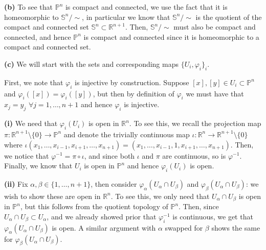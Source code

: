 \documentclass[10pt]{article}
\newcommand{\R}{\mathbb{R}}
\newcommand{\Sp}{\mathbb{S}}
\newcommand{\Pro}{\mathbb{P}}
\begin{document}
\textbf{(b)} To see that $\Pro^{n}$ is compact and connected, we use the fact that it is homeomorphic to $\Sp^{n}/\sim$, in particular we know that $\Sp^{n}/\sim$ is the quotient of the compact and connected set $\Sp^{n}\subset \R^{n+1}$. Then, $\Sp^{n}/\sim$ must also be compact and connected, and hence $\Pro^{n}$ is compact and connected since it is homeomorphic to a compact and connected set.

\textbf{(c)} We will start with the sets and corresponding maps $\{U_{i}, \varphi_{i}\}_{i}$.

First, we note that $\varphi_{i}$ is injective by construction. Suppose $[x],[y]\in U_{i}\subset\Pro^{n}$ and $\varphi_{i}([x]) = \varphi_{i}([y])$, but then by definition of $\varphi_{i}$ we must have that $x_{j} = y_{j}$ $\forall j= 1,\dots,n+1$ and hence $\varphi_{i}$ is injective.

\textbf{(i)}
We need that $\varphi_{i}(U_{i})$ is open in $\R^{n}$. To see this, we recall the projection map $\pi: \R^{n+1}\setminus\{0\} \to \Pro^{n}$ and denote the trivially continuous map $\iota: \R^{n} \to \R^{n+1}\setminus\{0\}$ where $\iota(x_{1},\dots,x_{i-1},x_{i+1},\dots,x_{n+1}) = (x_{1},\dots,x_{i-1},1,x_{i+1},\dots,x_{n+1})$. Then, we notice that $\varphi^{-1} = \pi \circ \iota$, and since both $\iota$ and $\pi$ are continuous, so is $\varphi^{-1}$. Finally, we know that $U_{i}$ is open in $\Pro^{n}$ and hence $\varphi_{i}(U_{i})$ is open.

\textbf{(ii)}
Fix $\alpha,\beta\in\{1,\dots,n+1\}$, then consider $\varphi_{\alpha}(U_{\alpha}\cap U_{\beta})$ and $\varphi_{\beta}(U_{\alpha}\cap U_{\beta})$: we wish to show these are open in $\R^{n}$. To see this, we only need that $U_{\alpha}\cap U_{\beta}$ is open in $\Pro^{n}$, but this follows from the quotient topology of $\Pro^{n}$. Then, since $U_{\alpha}\cap U_{\beta} \subset U_{\alpha}$, and we already showed prior that $\varphi_{i}^{-1}$ is continuous, we get that $\varphi_{\alpha}(U_{\alpha}\cap U_{\beta})$ is open. A similar argument with $\alpha$ swapped for $\beta$ shows the same for $\varphi_{\beta}(U_{\alpha}\cap U_{\beta})$.

\newpage
\end{document}
